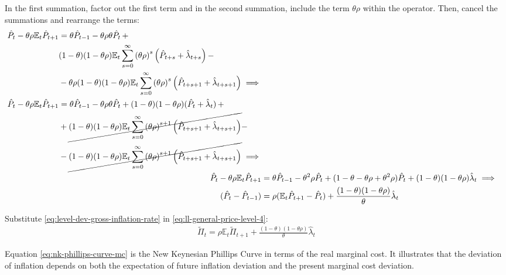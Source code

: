 \documentclass[
	12pt,
	]{article}
\numberwithin{equation}{section}
\newcommand{\E}[1][t]{{\mathbb{E}_{#1}}}
\theoremstyle{definition}
\theoremstyle{plain}
\theoremstyle{plain}
\theoremstyle{plain}
\begin{document}
In the first summation, factor out the first term and in the second summation, include the term $\theta \rho$ within the operator. Then, cancel the summations and rearrange the terms:
\begin{align}
	\begin{split}
		\hat{P}_t - \theta \rho \E \hat{P}_{t+1} &= \theta \hat{P}_{t-1} - \theta \rho \theta \hat{P}_t \, + \\
		& (1-\theta) (1- \theta \rho) \E \sum_{s=0}^{\infty} \left( \theta \rho \right)^s \left( \hat{P}_{t+s} + \hat{\lambda}_{t+s} \right) -
		\\
		& - \theta \rho (1-\theta) (1- \theta \rho) \E \sum_{s=0}^{\infty} \left( \theta \rho \right)^s \left( \hat{P}_{t+s+1} + \hat{\lambda}_{t+s+1} \right) \implies \nonumber 
	\end{split} \\
	\begin{split}
		\hat{P}_t - \theta \rho \E \hat{P}_{t+1} &= \theta \hat{P}_{t-1} - \theta \rho \theta \hat{P}_t + (1-\theta) (1- \theta \rho) (\hat{P}_t + \hat{\lambda}_t) \, + 
		\\
		& + \cancel{(1-\theta) (1- \theta \rho) \E \sum_{s=0}^{\infty} \left( \theta \rho \right)^{s+1} \left( \hat{P}_{t+s+1} + \hat{\lambda}_{t+s+1} \right)} -
		\\
		& - \cancel{(1-\theta) (1- \theta \rho) \E \sum_{s=0}^{\infty} \left( \theta \rho \right)^{s+1} \left( \hat{P}_{t+s+1} + \hat{\lambda}_{t+s+1} \right)} \implies \nonumber 
	\end{split} \\
	\hat{P}_t - \theta \rho \E \hat{P}_{t+1} &= \theta \hat{P}_{t-1} - \theta^2 \rho \hat{P}_t + (1- \theta -\theta \rho + \theta^2 \rho) \hat{P}_t + (1-\theta) (1- \theta \rho) \hat{\lambda}_t \implies \nonumber \\
	(\hat{P}_t - \hat{P}_{t-1}) &= \rho (\E \hat{P}_{t+1} - \hat{P}_t) + \frac{(1-\theta) (1- \theta \rho)}{\theta} \hat{\lambda}_t
	\label{eq:ll-general-price-level-4}
\end{align}

Substitute \ref{eq:level-dev-gross-inflation-rate} in \ref{eq:ll-general-price-level-4}:
\begin{align}
	\widetilde{\Pi}_t = \rho \E \widetilde{\Pi}_{t+1} + \frac{(1-\theta) (1- \theta \rho)}{\theta} \hat{\lambda}_t \label{eq:nk-phillips-curve-mc}
\end{align}

Equation \ref{eq:nk-phillips-curve-mc} is the New Keynesian Phillips Curve in terms of the real marginal cost. It illustrates that the deviation of inflation depends on both the expectation of future inflation deviation and the present marginal cost deviation.
\end{document}
